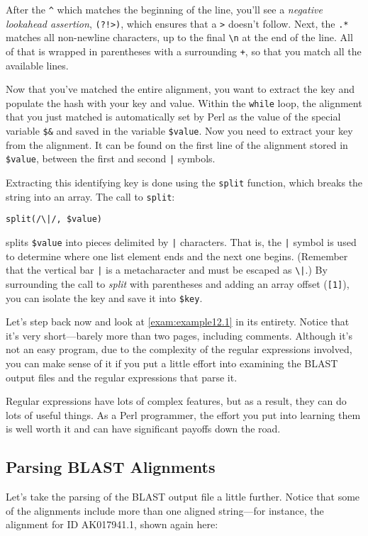 After the \verb|^| which matches the beginning of the line, you'll see a \textit{negative lookahead assertion}, \verb|(?!>)|, which ensures that a \verb|>| doesn't follow. Next, the \verb|.*| matches all non-newline characters, up to the final \verb|\n| at the end of the line. All of that is wrapped in parentheses with a surrounding \verb|+|, so that you match all the available lines.

Now that you've matched the entire alignment, you want to extract the key and populate the hash with your key and value. Within the \verb|while| loop, the alignment that you just matched is automatically set by Perl as the value of the special variable \verb|$&| and saved in the variable \verb|$value|. Now you need to extract your key from the alignment. It can be found on the first line of the alignment stored in \verb|$value|, between the first and second \verb=|= symbols.

Extracting this identifying key is done using the \verb|split| function, which breaks the string into an array. The call to \verb|split|:

\begin{lstlisting}
split(/\|/, $value)
\end{lstlisting}

splits \verb|$value| into pieces delimited by \verb=|= characters. That is, the \verb=|= symbol is used to determine where one list element ends and the next one begins. (Remember that the vertical bar \verb=|= is a metacharacter and must be escaped as \verb=\|=.) By surrounding the call to \textit{split} with parentheses and adding an array offset (\verb|[1]|), you can isolate the key and save it into \verb|$key|.

Let's step back now and look at \autoref{exam:example12.1} in its entirety. Notice that it's very short—barely more than two pages, including comments. Although it's not an easy program, due to the complexity of the regular expressions involved, you can make sense of it if you put a little effort into examining the BLAST output files and the regular expressions that parse it.

Regular expressions have lots of complex features, but as a result, they can do lots of useful things. As a Perl programmer, the effort you put into learning them is well worth it and can have significant payoffs down the road. 

\subsection{Parsing BLAST Alignments}
Let's take the parsing of the BLAST output file a little further. Notice that some of the alignments include more than one aligned string—for instance, the alignment for ID AK017941.1, shown again here: 

